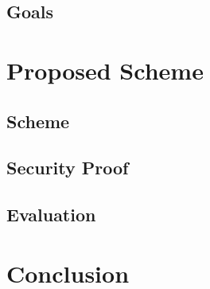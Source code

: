 \subsection{Goals}

\section{Proposed Scheme}

\subsection{Scheme}

\subsection{Security Proof}

\subsection{Evaluation}

\section{Conclusion}

